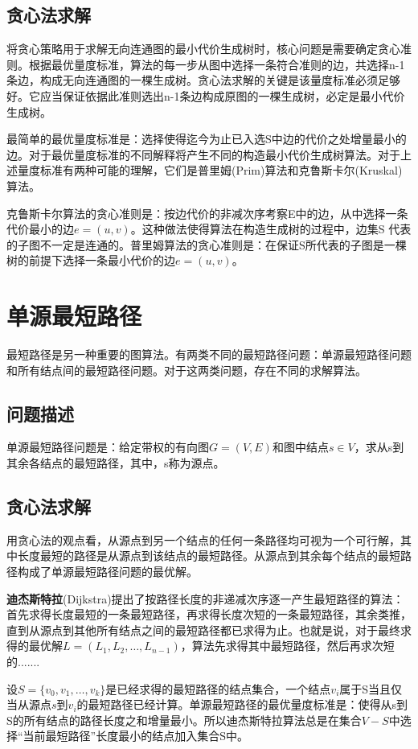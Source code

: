 \subsection*{贪心法求解}
将贪心策略用于求解无向连通图的最小代价生成树时，核心问题是需要确定贪心准则。根据最优量度标准，算法的每一步从图中选择一条符合准则的边，共选择n-1条边，构成无向连通图的一棵生成树。贪心法求解的关键是该量度标准必须足够好。它应当保证依据此准则选出n-1条边构成原图的一棵生成树，必定是最小代价生成树。

最简单的最优量度标准是：选择使得迄今为止已入选S中边的代价之处增量最小的边。对于最优量度标准的不同解释将产生不同的构造最小代价生成树算法。对于上述量度标准有两种可能的理解，它们是普里姆(Prim)算法和克鲁斯卡尔(Kruskal)算法。

克鲁斯卡尔算法的贪心准则是：按边代价的非减次序考察E中的边，从中选择一条代价最小的边$e=(u,v)$。这种做法使得算法在构造生成树的过程中，边集S
代表的子图不一定是连通的。普里姆算法的贪心准则是：在保证S所代表的子图是一棵树的前提下选择一条最小代价的边$e=(u,v)$。
\section{单源最短路径}
最短路径是另一种重要的图算法。有两类不同的最短路径问题：单源最短路径问题和所有结点间的最短路径问题。对于这两类问题，存在不同的求解算法。
\subsection*{问题描述}
单源最短路径问题是：给定带权的有向图$G=(V,E)$和图中结点$s\in V$，求从s到其余各结点的最短路径，其中，s称为源点。
\subsection*{贪心法求解}
用贪心法的观点看，从源点到另一个结点的任何一条路径均可视为一个可行解，其中长度最短的路径是从源点到该结点的最短路径。从源点到其余每个结点的最短路径构成了单源最短路径问题的最优解。

\textbf{迪杰斯特拉}(Dijkstra)提出了按路径长度的非递减次序逐一产生最短路径的算法：首先求得长度最短的一条最短路径，再求得长度次短的一条最短路径，其余类推，直到从源点到其他所有结点之间的最短路径都已求得为止。也就是说，对于最终求得的最优解$L=(L_1,L_2,\dots, L_{n-1})$，算法先求得其中最短路径，然后再求次短的.......

设$S=\{v_0,v_1,\dots,v_k \}$是已经求得的最短路径的结点集合，一个结点$v_i$属于S当且仅当从源点$s$到$v_i$的最短路径已经计算。单源最短路径的最优量度标准是：使得从s到S的所有结点的路径长度之和增量最小。所以迪杰斯特拉算法总是在集合$V-S$中选择“当前最短路径”长度最小的结点加入集合S中。
